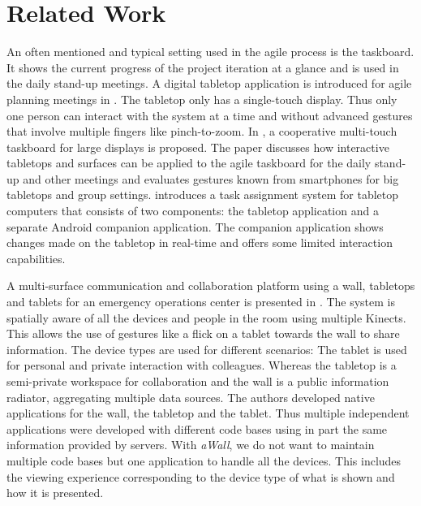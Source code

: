 \documentclass{sigchi}
\begin{document}
\section{Related Work}
An often mentioned and typical setting used in the agile process is the taskboard.
It shows the current progress of the project iteration at a glance and is used in the daily stand-up meetings. 
A digital tabletop application is introduced for agile planning meetings in \cite{Ghanam:4599452}. 
The tabletop only has a single-touch display. 
Thus only one person can interact with the system at a time and without advanced gestures that involve multiple fingers like pinch-to-zoom.
In \cite{Rubart:2014:CMS:2669485.2669551}, a cooperative multi-touch taskboard for large displays is proposed. 
The paper discusses how interactive tabletops and surfaces can be applied to the agile taskboard for the daily stand-up and other meetings and evaluates gestures known from smartphones for big tabletops and group settings.
\cite{Haas:2014:TAV:2669485.2669538} introduces a task assignment system for tabletop computers that consists of two components: the tabletop application and a separate Android companion application.
The companion application shows changes made on the tabletop in real-time and offers some limited interaction capabilities.

A multi-surface communication and collaboration platform using a wall, tabletops and tablets for an emergency operations center is presented in \cite{Chokshi:2014:EMM:2669485.2669520}. 
The system is spatially aware of all the devices and people in the room using multiple Kinects.
This allows the use of gestures like a flick on a tablet towards the wall to share information.
The device types are used for different scenarios:
The tablet is used for personal and private interaction with colleagues.
Whereas the tabletop is a semi-private workspace for collaboration and the wall is a public information radiator, aggregating multiple data sources.
The authors developed native applications for the wall, the tabletop and the tablet.
Thus multiple independent applications were developed with different code bases using in part the same information provided by servers.
With \textit{aWall}, we do not want to maintain multiple code bases but one application to handle all the devices.
This includes the viewing experience corresponding to the device type of what is shown and how it is presented.
\end{document}
